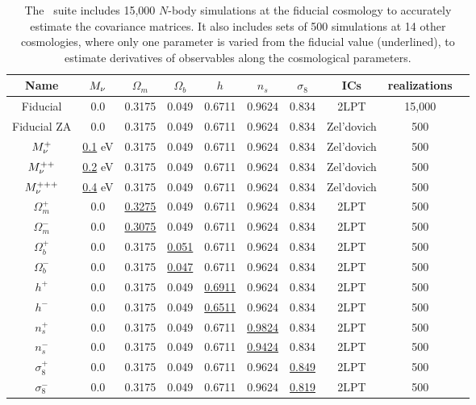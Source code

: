 \begin{table}
\caption{
The \quij~suite includes 15,000 $N$-body simulations at the fiducial cosmology to 
accurately estimate the covariance matrices. It also includes sets of 500 simulations at 14 
other cosmologies, where only one parameter is varied from the fiducial value (underlined), 
to estimate derivatives of observables along the cosmological parameters.
} 
\begin{center}
\begin{tabular}{cccccccccc} \toprule
Name  &$M_\nu$ & $\Omega_m$ & $\Omega_b$ & $h$ & $n_s$ & $\sigma_8$ & ICs & realizations \\[3pt] \hline\hline
Fiducial 	& 0.0         & 0.3175 & 0.049 & 0.6711 & 0.9624 & 0.834 & 2LPT & 15,000 \\ 
Fiducial ZA     & 0.0         & 0.3175 & 0.049 & 0.6711 & 0.9624 & 0.834 & Zel'dovich& 500 \\ 
$M_\nu^+$       & \underline{0.1} eV & 0.3175 & 0.049 & 0.6711 & 0.9624 & 0.834 & Zel'dovich & 500 \\ 
$M_\nu^{++}$    & \underline{0.2} eV & 0.3175 & 0.049 & 0.6711 & 0.9624 & 0.834 & Zel'dovich & 500 \\ 
$M_\nu^{+++}$   & \underline{0.4} eV & 0.3175 & 0.049 & 0.6711 & 0.9624 & 0.834 & Zel'dovich & 500 \\ 
$\Omega_m^+$    & 0.0   & \underline{ 0.3275} & 0.049 & 0.6711 & 0.9624 & 0.834 & 2LPT & 500 \\ 
$\Omega_m^-$    & 0.0   & \underline{ 0.3075} & 0.049 & 0.6711 & 0.9624 & 0.834 & 2LPT & 500 \\ 
$\Omega_b^+$    & 0.0   & 0.3175 & \underline{0.051} & 0.6711 & 0.9624 & 0.834 & 2LPT & 500 \\ 
$\Omega_b^-$    & 0.0   & 0.3175 & \underline{0.047} & 0.6711 & 0.9624 & 0.834 & 2LPT & 500 \\ 
$h^+$           & 0.0   & 0.3175 & 0.049 & \underline{0.6911} & 0.9624 & 0.834 & 2LPT & 500 \\ 
$h^-$           & 0.0   & 0.3175 & 0.049 & \underline{0.6511} & 0.9624 & 0.834 & 2LPT & 500 \\ 
$n_s^+$         & 0.0   & 0.3175 & 0.049 & 0.6711 & \underline{0.9824} & 0.834 & 2LPT & 500 \\ 
$n_s^-$         & 0.0   & 0.3175 & 0.049 & 0.6711 & \underline{0.9424} & 0.834 & 2LPT & 500 \\ 
$\sigma_8^+$    & 0.0   & 0.3175 & 0.049 & 0.6711 & 0.9624 & \underline{0.849} & 2LPT & 500 \\ 
$\sigma_8^-$    & 0.0   & 0.3175 & 0.049 & 0.6711 & 0.9624 & \underline{0.819} & 2LPT & 500 \\[3pt]
\hline
\end{tabular} \label{tab:sims}
\end{center}
\end{table}
